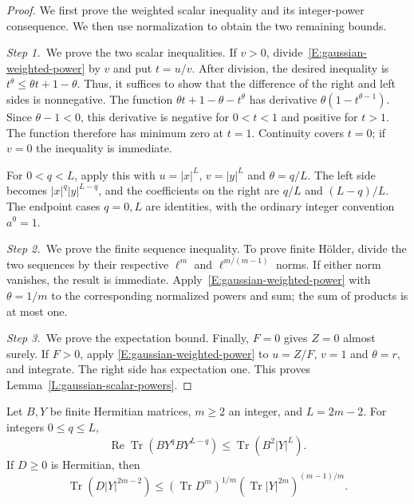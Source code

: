 \begin{proof}
  We first prove the weighted scalar inequality and its integer-power
  consequence. We then use normalization to obtain the two remaining bounds.

  \medskip
  \noindent\textit{Step 1.~}We prove the two scalar inequalities.
  If $v > 0$, divide~\eqref{E:gaussian-weighted-power} by $v$ and put $t = u/v$.
  After division, the desired inequality is $t^\theta \le \theta t+1-\theta$.
  Thus, it suffices to show that the difference of the right and left sides is
  nonnegative.
  The function $\theta t+1-\theta-t^\theta$ has derivative
  $\theta(1-t^{\theta-1})$. Since $\theta-1 < 0$, this derivative is negative
  for $0 < t < 1$ and positive for $t > 1$. The function therefore has minimum
  zero at $t = 1$. Continuity covers $t = 0$; if $v = 0$ the inequality is
  immediate.

  For $0 < q < L$, apply this with $u = |x|^L$, $v = |y|^L$ and $\theta =
  q/L$. The left side becomes $|x|^q|y|^{L-q}$, and the coefficients on the
  right are $q/L$ and $(L-q)/L$. The endpoint cases $q = 0,L$ are identities,
  with the ordinary integer convention $a^0 = 1$.

  \medskip
  \noindent\textit{Step 2.~}We prove the finite sequence inequality.
  To prove finite H\"older, divide the two sequences by their respective
  $\ell^m$ and $\ell^{m/(m-1)}$ norms. If either norm vanishes, the result is
  immediate. Apply~\eqref{E:gaussian-weighted-power} with $\theta = 1/m$ to the
  corresponding normalized powers and sum; the sum of products is at most one.

  \medskip
  \noindent\textit{Step 3.~}We prove the expectation bound.
  Finally, $F = 0$ gives $Z = 0$ almost surely. If $F >
  0$, apply \eqref{E:gaussian-weighted-power} to $u = Z/F$, $v = 1$ and $\theta
  = r$, and integrate. The right side has expectation one.
  This proves
  Lemma~\ref{L:gaussian-scalar-powers}.
\end{proof}

\begin{lemma}\label{L:gaussian-trace-bounds}
  Let $B,Y$ be finite Hermitian matrices, $m \ge 2$ an integer, and $L = 2m-2$.
  For integers $0 \le q \le L$,
  \begin{equation}\label{E:gaussian-trace-word}
    \operatorname{Re}\operatorname{Tr}(BY^qBY^{L-q})
    \le \operatorname{Tr}(B^2|Y|^L).
  \end{equation}
  If $D \ge 0$ is Hermitian, then
  \begin{equation}\label{E:gaussian-trace-holder}
    \operatorname{Tr}(D|Y|^{2m-2})
    \le (\operatorname{Tr}D^m)^{1/m}
    (\operatorname{Tr}|Y|^{2m})^{(m-1)/m}.
  \end{equation}
\end{lemma}

